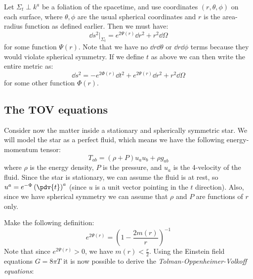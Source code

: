 \documentclass{jknotes}
\begin{document}
Let \(\Sigma_t \perp k^a\) be a foliation of the spacetime, and use coordinates \((r,\theta,\phi)\) on each surface, where \(\theta,\phi\) are the usual spherical coordinates and \(r\) is the area-radius function as defined earlier. Then we must have:
\begin{equation}
    \dd{s}^2|_{\Sigma_t} = e^{2\Psi(r)}\dd{r}^2 + r^2\dd{\Omega}
\end{equation}
for some function \(\Psi(r)\). Note that we have no \(\dd{r}\dd{\theta}\) or \(\dd{r}\dd{\phi}\) terms because they would violate spherical symmetry. If we define \(t\) as above we can then write the entire metric as:
\begin{equation}
    \dd{s}^2 = -e^{2\Phi(r)}\dd{t}^2 + e^{2\Psi(r)}\dd{r}^2 + r^2\dd{\Omega}
\end{equation}
for some other function \(\Phi(r)\).

\subsection{The TOV equations}
Consider now the matter inside a stationary and spherically symmetric star. We will model the star as a perfect fluid, which means we have the following energy-momentum tensor:
\begin{equation}
    T_{ab} = (\rho+P)u_au_b + \rho g_{ab}
\end{equation}
where \(\rho\) is the energy density, \(P\) is the pressure, and \(u_a\) is the 4-velocity of the fluid. Since the star is stationary, we can assume the fluid is at rest, so \(u^a = e^{-\Phi}\left( \pdv{t} \right)^a\) (since \(u\) is a unit vector pointing in the \(t\) direction). Also, since we have spherical symmetry we can assume that \(\rho\) and \(P\) are functions of \(r\) only.

Make the following definition:
\begin{equation}
    e^{2\Psi(r)} = \left( 1 - \frac{2m(r)}{r} \right)^{-1}
\end{equation}
Note that since \(e^{2\Psi(r)}>0\), we have \(m(r) < \frac{r}{2}\). Using the Einstein field equations \(G = 8\pi T\) it is now possible to derive the \emph{Tolman-Oppenheimer-Volkoff equations}:
\end{document}
